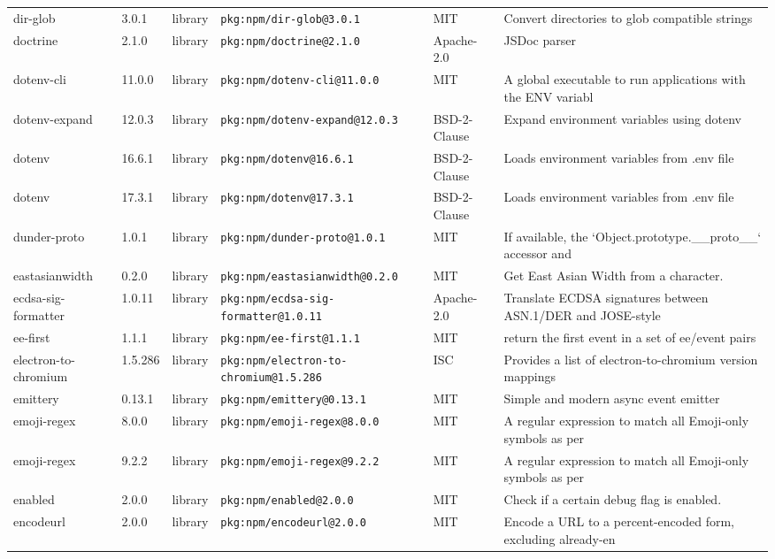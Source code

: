 \documentclass[11pt]{article}
\begin{document}
\begin{longtable}{|l|l|l|p{2.2cm}|l|p{4cm}|}
dir-glob & 3.0.1 & library & \texttt{pkg:npm/dir-glob@3.0.1} & MIT & Convert directories to glob compatible strings \\
doctrine & 2.1.0 & library & \texttt{pkg:npm/doctrine@2.1.0} & Apache-2.0 & JSDoc parser \\
dotenv-cli & 11.0.0 & library & \texttt{pkg:npm/dotenv-cli@11.0.0} & MIT & A global executable to run applications with the ENV variabl \\
dotenv-expand & 12.0.3 & library & \texttt{pkg:npm/dotenv-expand@12.0.3} & BSD-2-Clause & Expand environment variables using dotenv \\
dotenv & 16.6.1 & library & \texttt{pkg:npm/dotenv@16.6.1} & BSD-2-Clause & Loads environment variables from .env file \\
dotenv & 17.3.1 & library & \texttt{pkg:npm/dotenv@17.3.1} & BSD-2-Clause & Loads environment variables from .env file \\
dunder-proto & 1.0.1 & library & \texttt{pkg:npm/dunder-proto@1.0.1} & MIT & If available, the `Object.prototype.\_\_proto\_\_` accessor and  \\
eastasianwidth & 0.2.0 & library & \texttt{pkg:npm/eastasianwidth@0.2.0} & MIT & Get East Asian Width from a character. \\
ecdsa-sig-formatter & 1.0.11 & library & \texttt{pkg:npm/ecdsa-sig-formatter@1.0.11} & Apache-2.0 & Translate ECDSA signatures between ASN.1/DER and JOSE-style  \\
ee-first & 1.1.1 & library & \texttt{pkg:npm/ee-first@1.1.1} & MIT & return the first event in a set of ee/event pairs \\
electron-to-chromium & 1.5.286 & library & \texttt{pkg:npm/electron-to-chromium@1.5.286} & ISC & Provides a list of electron-to-chromium version mappings \\
emittery & 0.13.1 & library & \texttt{pkg:npm/emittery@0.13.1} & MIT & Simple and modern async event emitter \\
emoji-regex & 8.0.0 & library & \texttt{pkg:npm/emoji-regex@8.0.0} & MIT & A regular expression to match all Emoji-only symbols as per  \\
emoji-regex & 9.2.2 & library & \texttt{pkg:npm/emoji-regex@9.2.2} & MIT & A regular expression to match all Emoji-only symbols as per  \\
enabled & 2.0.0 & library & \texttt{pkg:npm/enabled@2.0.0} & MIT & Check if a certain debug flag is enabled. \\
encodeurl & 2.0.0 & library & \texttt{pkg:npm/encodeurl@2.0.0} & MIT & Encode a URL to a percent-encoded form, excluding already-en \\

\end{longtable}
\end{document}
